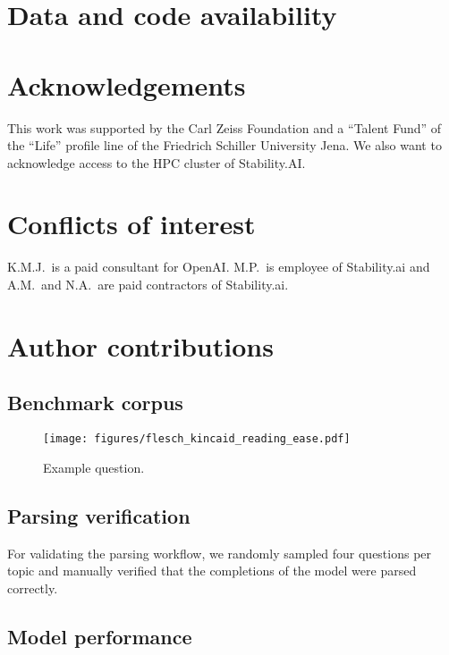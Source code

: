 \documentclass[11pt, oneside]{article}
\begin{document}
\section*{Data and code availability}

\section*{Acknowledgements}
This work was supported by the Carl Zeiss Foundation and a \enquote{Talent Fund} of the \enquote{Life} profile line of the Friedrich Schiller University Jena.
We also want to acknowledge access to the HPC cluster of Stability.AI.

\section*{Conflicts of interest}
K.M.J.\ is a paid consultant for OpenAI. M.P.\ is employee of Stability.ai and A.M.\ and N.A.\ are paid contractors of Stability.ai.

\section*{Author contributions}




\appendix

\subsection{Benchmark corpus}

\begin{figure}
    \centering
    \texttt{[image: figures/flesch\_kincaid\_reading\_ease.pdf]}
    \caption{Example question.}
    \label{fig:flesch_kincaid_reading_ease}
\end{figure}

\subsection{Parsing verification}\label{sec:manually-verified-parsing}
For validating the parsing workflow, we randomly sampled four questions per topic and manually verified that the completions of the model were parsed correctly.


\subsection{Model performance}
\end{document}
